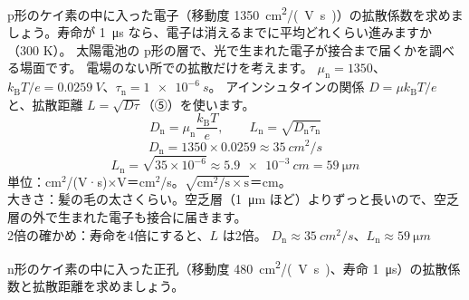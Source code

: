\label{ph:原-9:ex6}
\begin{phreidai}[電子の拡散係数と拡散距離]
p形のケイ素の中に入った電子（移動度 \qty{1350}{cm^2/(V.s)}）の拡散係数を求めましょう。寿命が \qty{1}{\micro s} なら、電子は消えるまでに平均どれくらい進みますか（300 K）。
\phbamen
太陽電池の p形の層で、光で生まれた電子が接合まで届くかを調べる場面です。
\phmushi
電場のない所での拡散だけを考えます。
\phzu
$\mu_{\mathrm n}=1350$、$k_{\mathrm B}T/e=\qty{0.0259}{V}$、$\tau_{\mathrm n}=\qty{1e-6}{s}$。
\phriyu
アインシュタインの関係 $D=\mu k_{\mathrm B}T/e$ と、拡散距離 $L=\sqrt{D\tau}$（⑤）を使います。
\phtateru
\[ D_{\mathrm n}=\mu_{\mathrm n}\frac{k_{\mathrm B}T}{e},\qquad L_{\mathrm n}=\sqrt{D_{\mathrm n}\tau_{\mathrm n}} \]
\phtoku
\[ D_{\mathrm n}=1350\times0.0259\approx\qty{35}{cm^2/s} \]
\[ L_{\mathrm n}=\sqrt{35\times10^{-6}}\approx\qty{5.9e-3}{cm}=\qty{59}{\micro m} \]
\phtashikame
単位：cm$^2$/(V·s)×V＝cm$^2$/s。$\sqrt{\text{cm}^2\text{/s}\times\text{s}}$＝cm。\\
大きさ：髪の毛の太さくらい。空乏層（\qty{1}{\micro m} ほど）よりずっと長いので、空乏層の外で生まれた電子も接合に届きます。\\
2倍の確かめ：寿命を4倍にすると、$L$ は2倍。
\kotae $D_{\mathrm n}\approx\qty{35}{cm^2/s}$、$L_{\mathrm n}\approx\qty{59}{\micro m}$
\end{phreidai}
\begin{jibun}
n形のケイ素の中に入った正孔（移動度 \qty{480}{cm^2/(V.s)}、寿命 \qty{1}{\micro s}）の拡散係数と拡散距離を求めましょう。
\end{jibun}

